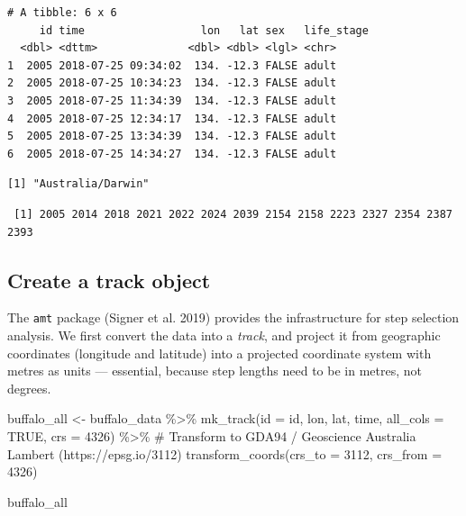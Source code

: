 \documentclass[
  letterpaper,
  DIV=11,
  numbers=noendperiod]{scrartcl}
\newenvironment{Shaded}{\begin{snugshade}}{\end{snugshade}}
\newcommand{\AttributeTok}[1]{\textcolor[rgb]{0.40,0.45,0.13}{#1}}
\newcommand{\CommentTok}[1]{\textcolor[rgb]{0.37,0.37,0.37}{#1}}
\newcommand{\ConstantTok}[1]{\textcolor[rgb]{0.56,0.35,0.01}{#1}}
\newcommand{\DecValTok}[1]{\textcolor[rgb]{0.68,0.00,0.00}{#1}}
\newcommand{\FunctionTok}[1]{\textcolor[rgb]{0.28,0.35,0.67}{#1}}
\newcommand{\NormalTok}[1]{\textcolor[rgb]{0.00,0.23,0.31}{#1}}
\newcommand{\OtherTok}[1]{\textcolor[rgb]{0.00,0.23,0.31}{#1}}
\newcommand{\SpecialCharTok}[1]{\textcolor[rgb]{0.37,0.37,0.37}{#1}}
\begin{document}
\begin{verbatim}
# A tibble: 6 x 6
     id time                  lon   lat sex   life_stage
  <dbl> <dttm>              <dbl> <dbl> <lgl> <chr>     
1  2005 2018-07-25 09:34:02  134. -12.3 FALSE adult     
2  2005 2018-07-25 10:34:23  134. -12.3 FALSE adult     
3  2005 2018-07-25 11:34:39  134. -12.3 FALSE adult     
4  2005 2018-07-25 12:34:17  134. -12.3 FALSE adult     
5  2005 2018-07-25 13:34:39  134. -12.3 FALSE adult     
6  2005 2018-07-25 14:34:27  134. -12.3 FALSE adult     
\end{verbatim}

\begin{Shaded}
\end{Shaded}

\begin{verbatim}
[1] "Australia/Darwin"
\end{verbatim}

\begin{Shaded}
\end{Shaded}

\begin{verbatim}
 [1] 2005 2014 2018 2021 2022 2024 2039 2154 2158 2223 2327 2354 2387 2393
\end{verbatim}

\subsection{Create a track object}\label{create-a-track-object}

The \texttt{amt} package (Signer et al. 2019) provides the
infrastructure for step selection analysis. We first convert the data
into a \emph{track}, and project it from geographic coordinates
(longitude and latitude) into a projected coordinate system with metres
as units --- essential, because step lengths need to be in metres, not
degrees.

\begin{Shaded}
\begin{Highlighting}[]
\NormalTok{buffalo\_all }\OtherTok{\textless{}{-}}\NormalTok{ buffalo\_data }\SpecialCharTok{\%\textgreater{}\%}
  \FunctionTok{mk\_track}\NormalTok{(}\AttributeTok{id =}\NormalTok{ id, lon, lat, time, }\AttributeTok{all\_cols =} \ConstantTok{TRUE}\NormalTok{, }\AttributeTok{crs =} \DecValTok{4326}\NormalTok{) }\SpecialCharTok{\%\textgreater{}\%}
  \CommentTok{\# Transform to GDA94 / Geoscience Australia Lambert (https://epsg.io/3112)}
  \FunctionTok{transform\_coords}\NormalTok{(}\AttributeTok{crs\_to =} \DecValTok{3112}\NormalTok{, }\AttributeTok{crs\_from =} \DecValTok{4326}\NormalTok{)}

\NormalTok{buffalo\_all}
\end{Highlighting}
\end{Shaded}
\end{document}
